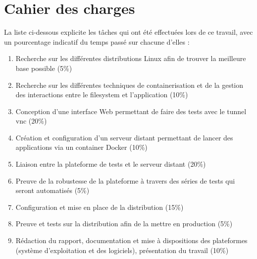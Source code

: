 \section*{Cahier des charges}
La liste ci-dessous explicite les tâches qui ont été effectuées lors de ce travail, avec un pourcentage indicatif du temps passé sur chacune d'elles :
\begin{enumerate}
    \item Recherche sur les différentes distributions Linux afin de trouver la meilleure base possible (5\%)
    \item Recherche sur les différentes techniques de containerisation et de la gestion des interactions entre le filesystem et l'application (10\%)
    \item Conception d'une interface Web permettant de faire des tests  avec le tunnel \acrshort{vnc} (20\%)
    \item Création et configuration d'un serveur distant permettant de lancer des applications via un container Docker (10\%) 
    \item Liaison entre la plateforme de tests et le serveur distant (20\%)
    \item Preuve de la robustesse de la plateforme à travers des séries de tests qui seront automatisés (5\%)
    \item Configuration et mise en place de la distribution (15\%)
    \item Preuve et tests sur la distribution afin de la mettre en production (5\%)
    \item Rédaction du rapport, documentation et mise à dispositions des plateformes (système d'exploitation et des logiciels), présentation du travail (10\%)
\end{enumerate}


